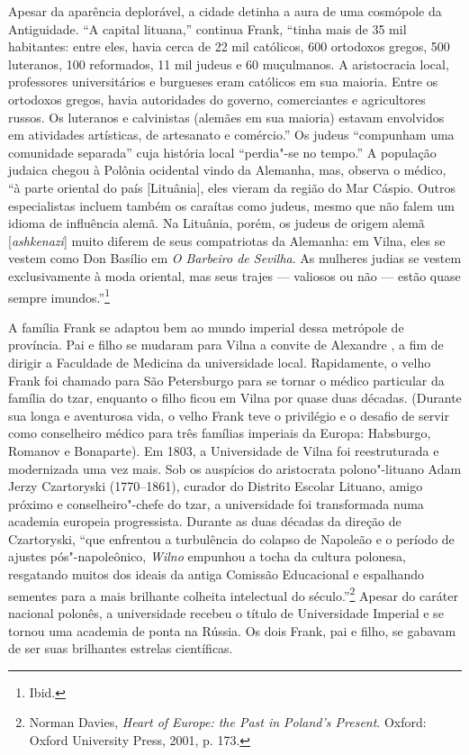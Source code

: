 Apesar da aparência deplorável, a cidade detinha a aura de uma cosmópole
da Antiguidade. ``A capital lituana,'' continua Frank, ``tinha mais de
35 mil habitantes: entre eles, havia cerca de 22 mil católicos, 600
ortodoxos gregos, 500 luteranos, 100 reformados, 11 mil judeus e 60
muçulmanos. A aristocracia local, professores universitários e burgueses
eram católicos em sua maioria. Entre os ortodoxos gregos, havia
autoridades do governo, comerciantes e agricultores russos. Os luteranos
e calvinistas (alemães em sua maioria) estavam envolvidos em atividades
artísticas, de artesanato e comércio.'' Os judeus ``compunham uma
comunidade separada'' cuja história local ``perdia"-se no tempo.'' A
população judaica chegou à Polônia ocidental vindo da Alemanha, mas,
observa o médico, ``à parte oriental do país {[}Lituânia{]}, eles vieram
da região do Mar Cáspio. Outros especialistas incluem também os caraítas
como judeus, mesmo que não falem um idioma de influência alemã. Na
Lituânia, porém, os judeus de origem alemã {[}\textit{ashkenazi}{]} muito diferem
de seus compatriotas da Alemanha: em Vilna, eles se vestem como Don
Basílio em \textit{O Barbeiro de Sevilha}. As mulheres judias se vestem
exclusivamente à moda oriental, mas seus trajes --- valiosos ou não ---
estão quase sempre imundos.''\footnote{Ibid.}

A família Frank se adaptou bem ao mundo imperial dessa metrópole de
província. Pai e filho se mudaram para Vilna a convite de Alexandre , a
fim de dirigir a Faculdade de Medicina da universidade local.
Rapidamente, o velho Frank foi chamado para São Petersburgo para se
tornar o médico particular da família do tzar, enquanto o filho ficou em
Vilna por quase duas décadas. (Durante sua longa e aventurosa vida, o
velho Frank teve o privilégio e o desafio de servir como conselheiro
médico para três famílias imperiais da Europa: Habsburgo, Romanov e
Bonaparte). Em 1803, a Universidade de Vilna foi reestruturada e
modernizada uma vez mais. Sob os auspícios do aristocrata polono"-lituano
Adam Jerzy Czartoryski (1770--1861), curador do Distrito Escolar Lituano,
amigo próximo e conselheiro"-chefe do tzar, a universidade foi
transformada numa academia europeia progressista. Durante as duas
décadas da direção de Czartoryski, ``que enfrentou a turbulência do
colapso de Napoleão e o período de ajustes pós"-napoleônico, \textit{Wilno}
empunhou a tocha da cultura polonesa, resgatando muitos dos ideais da
antiga Comissão Educacional e espalhando sementes para a mais brilhante
colheita intelectual do século.''\footnote{Norman Davies, \textit{Heart of Europe: the Past in Poland's Present}. Oxford: Oxford University Press, 2001, p. 173.} Apesar do caráter nacional polonês, a universidade recebeu o título de Universidade Imperial e se tornou uma
academia de ponta na Rússia. Os dois Frank, pai e filho, se gabavam de
ser suas brilhantes estrelas científicas.


